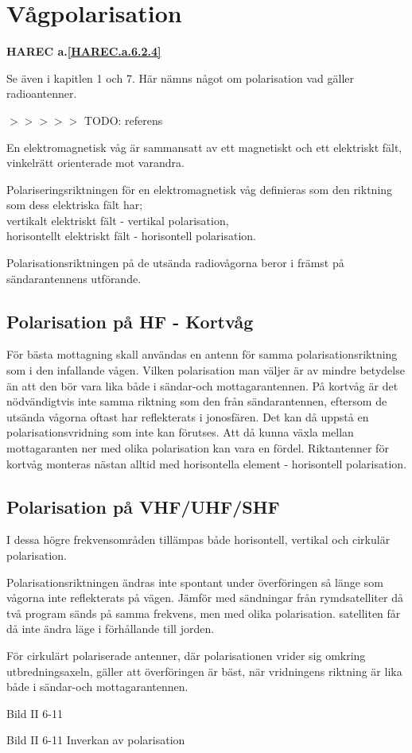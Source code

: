 \section{Vågpolarisation}
\textbf{
HAREC a.\ref{HAREC.a.6.2.4}\label{myHAREC.a.6.2.4}
}

Se även i kapitlen 1 och 7. Här nämns något om polarisation vad gäller
radioantenner.

$>>>>>$ TODO: referens

En elektromagnetisk våg är sammansatt av ett magnetiskt och ett
elektriskt fält, vinkelrätt orienterade mot varandra.

Polariseringsriktningen för en elektromagnetisk våg definieras som den riktning
som dess elektriska fält har; \\
vertikalt elektriskt fält - vertikal polarisation, \\
horisontellt elektriskt fält - horisontell polarisation.

Polarisationsriktningen på de utsända radiovågorna beror i främst på
sändarantennens utförande.

\subsection{Polarisation på HF - Kortvåg}
För bästa mottagning skall användas en antenn för samma
polarisationsriktning som i den infallande vågen. Vilken polarisation
man väljer är av mindre betydelse än att den bör vara lika både i
sändar-och mottagarantennen. På kortvåg är det nödvändigtvis inte
samma riktning som den från sändarantennen, eftersom de utsända
vågorna oftast har reflekterats i jonosfären. Det kan då uppstå en
polarisationsvridning som inte kan förutses. Att då kunna växla mellan
mottagaranten ner med olika polarisation kan vara en
fördel. Riktantenner för kortvåg monteras nästan alltid med
horisontella element - horisontell polarisation.

\subsection{Polarisation på VHF/UHF/SHF}

I dessa högre frekvensområden tillämpas både horisontell, vertikal och
cirkulär polarisation.

Polarisationsriktningen ändras inte spontant under överföringen så
länge som vågorna inte reflekterats på vägen. Jämför med sändningar
från rymdsatelliter då två program sänds på samma frekvens, men med
olika polarisation. satelliten får då inte ändra läge i förhållande
till jorden.

För cirkulärt polariserade antenner, där polarisationen vrider sig
omkring utbredningsaxeln, gäller att överföringen är bäst, när
vridningens riktning är lika både i sändar-och mottagarantennen.

Bild II 6-11

Bild II 6-11 Inverkan av polarisation
